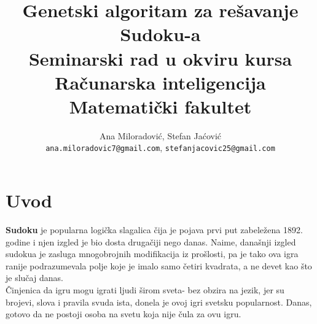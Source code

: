 \documentclass[a4paper]{article}
\begin{document}
\title{Genetski algoritam za rešavanje Sudoku-a\\
\vspace{5mm}
\small{Seminarski rad u okviru kursa\\Računarska inteligencija\\ Matematički fakultet}}

\author{Ana Miloradović, Stefan Jaćović\protect\\
\small{\texttt{ana.miloradovic7@gmail.com},} \texttt{stefanjacovic25@gmail.com}}



\maketitle


\tableofcontents

\newpage

\section{Uvod}
\label{sec:sudoku}

\textbf{Sudoku} je popularna logička slagalica čija je pojava prvi put zabeležena  1892. godine i njen izgled je bio dosta drugačiji nego danas. Naime, današnji izgled sudokua je zasluga mnogobrojnih modifikacija iz prošlosti, pa je tako ova igra ranije podrazumevala polje koje je imalo samo četiri kvadrata, a ne devet kao što je slučaj danas.\\
Činjenica da igru mogu igrati ljudi širom sveta- bez obzira na jezik, jer su brojevi, slova i pravila svuda ista, donela je ovoj igri svetsku popularnost. Danas, gotovo da ne postoji osoba na svetu koja nije čula za ovu igru. 
\end{document}
